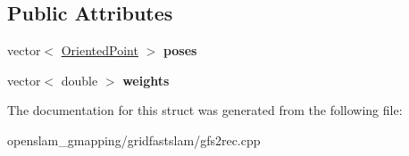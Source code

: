 \subsection*{Public Attributes}
\begin{DoxyCompactItemize}
\item 
\mbox{\label{structScanMatchRecord_a5e7e82154d5938a52cc62dbe1a794c06}} 
vector$<$ \hyperlink{structGMapping_1_1orientedpoint}{Oriented\+Point} $>$ {\bfseries poses}
\item 
\mbox{\label{structScanMatchRecord_a9b7e82257cf357c41bca9d7ce3073db9}} 
vector$<$ double $>$ {\bfseries weights}
\end{DoxyCompactItemize}


The documentation for this struct was generated from the following file\+:\begin{DoxyCompactItemize}
\item 
openslam\+\_\+gmapping/gridfastslam/gfs2rec.\+cpp\end{DoxyCompactItemize}
